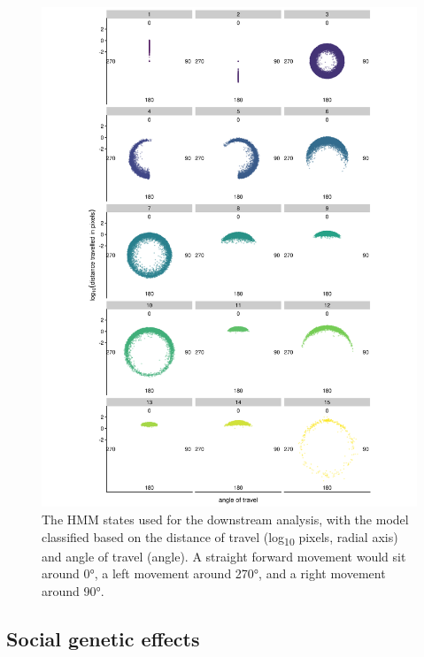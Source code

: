\documentclass[
]{article}
\begin{document}
\begin{figure}
\includegraphics[width=1\linewidth]{figs/mikk_behaviour/0.08_15_polar_all_dge} \caption{The HMM states used for the downstream analysis, with the model classified based on the distance of travel (log\textsubscript{10} pixels, radial axis) and angle of travel (angle). A straight forward movement would sit around 0°, a left movement around 270°, and a right movement around 90°.}\label{fig:mikk-hmm-sym}
\end{figure}

\hypertarget{social-genetic-effects}{%
\subsection{Social genetic effects}\label{social-genetic-effects}}
\end{document}

